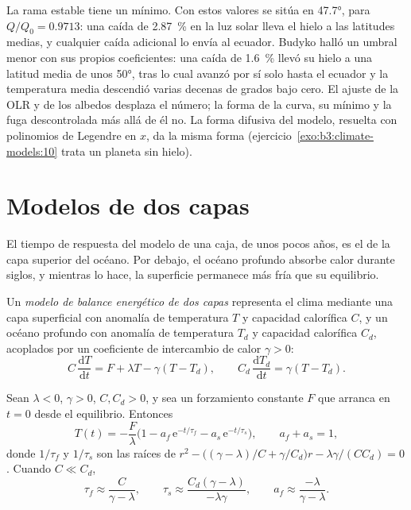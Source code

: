 
La rama estable tiene un mínimo. Con estos valores se sitúa en \ang{47.7},
para $Q/Q_0 = \num{0.9713}$: una caída de \qty{2.87}{\percent} en la luz solar
lleva el hielo a las latitudes medias, y cualquier caída adicional lo envía
al ecuador. Budyko halló un umbral menor con sus propios coeficientes: una
caída de \qty{1.6}{\percent} llevó su hielo a una latitud media de unos
\ang{50}, tras lo cual avanzó por sí solo hasta el ecuador y la temperatura
media descendió varias decenas de grados bajo cero. El ajuste de la OLR
y de los albedos desplaza el número; la forma de la curva, su mínimo y la
fuga descontrolada más allá de él no. La forma difusiva del modelo, resuelta
con polinomios de Legendre en $x$, da la misma forma (ejercicio~\ref{exo:b3:climate-models:10}
trata un planeta sin hielo).

\section{Modelos de dos capas}\label{sec:b3:climate-models:two-layer}

El tiempo de respuesta del modelo de una caja, de unos pocos años, es el de la
capa superior del océano. Por debajo, el océano profundo absorbe calor durante siglos, y
mientras lo hace, la superficie permanece más fría que su equilibrio.

\begin{definition}\label{def:b3:climate-models:two-layer}
Un \emph{modelo de balance energético de dos capas}
representa el clima mediante una capa superficial con anomalía de temperatura $T$
y capacidad calorífica $C$, y un océano profundo con anomalía de temperatura $T_d$ y
capacidad calorífica $C_d$, acoplados por un coeficiente de intercambio de calor $\gamma > 0$:
\[
C\,\frac{\mathrm dT}{\mathrm dt} = F + \lambda T - \gamma(T - T_d), \qquad
C_d\,\frac{\mathrm dT_d}{\mathrm dt} = \gamma(T - T_d) .
\]
\end{definition}

\begin{theorem}\label{thm:b3:climate-models:two-layer}
Sean $\lambda < 0$, $\gamma > 0$, $C, C_d > 0$, y sea un forzamiento constante
$F$ que arranca en $t = 0$ desde el equilibrio. Entonces
\[
T(t) = -\frac{F}{\lambda}\Big(1 - a_f\,\mathrm e^{-t/\tau_f} - a_s\,\mathrm
e^{-t/\tau_s}\Big), \qquad a_f + a_s = 1 ,
\]
donde $1/\tau_f$ y $1/\tau_s$ son las raíces de $r^2 - \big((\gamma -
\lambda)/C + \gamma/C_d\big)r - \lambda\gamma/(CC_d) = 0$. Cuando $C \ll C_d$,
\[
\tau_f \approx \frac{C}{\gamma - \lambda}, \qquad
\tau_s \approx \frac{C_d(\gamma - \lambda)}{-\lambda\gamma}, \qquad
a_f \approx \frac{-\lambda}{\gamma - \lambda} .
\]
\end{theorem}

